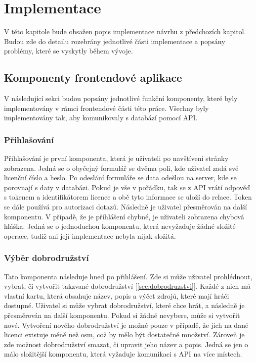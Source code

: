 \chapter{Implementace}
V této kapitole bude obsažen popis implementace návrhu z předchozích kapitol. Budou zde do detailu rozebrány jednotlivé části implementace a popsány problémy, které se vyskytly během vývoje.

\section{Komponenty frontendové aplikace}
V následující sekci budou popsány jednotlivé funkční komponenty, které byly implementovány v rámci frontendové části této práce. Všechny byly implementovány tak, aby komunikovaly s databází pomocí API.

\subsection{Přihlašování}
Přihlašování je první komponenta, která je uživateli po navštívení stránky zobrazena. Jedná se o obyčejný formulář se dvěma poli, kde uživatel zadá své licenční číslo a heslo. Po odeslání formuláře se data odešlou na server, kde se porovnají s daty v databázi. Pokud je vše v pořádku, tak se z API vrátí odpověď s tokenem a identifikátorem licence a obě tyto informace se uloží do relace. Token se dále používá pro autorizaci dotazů. Následně je uživatel přesměrován na další komponentu. V případě, že je příhlášení chybné, je uživateli zobrazena chybová hláška. Jedná se o jednoduchou komponentu, která nevyžaduje žádné složité operace, tudíž ani její implementace nebyla nijak složitá.

\subsection{Výběr dobrodružství}
Tato komponenta následuje hned po přihlášení. Zde si může uživatel prohlédnout, vybrat, či vytvořit takzvané dobrodružství [\ref{sec:dobrodruzstvi}]. Každé z nich má vlastní kartu, která obsahuje název, popis a výčet zdrojů, které mají hráči dostupné. Uživatel si může vybrat dobrodružství, které chce hrát, a následně je přesměrován na další komponentu. Pokud si žádné nevybere, může si vytvořit nové. Vytvoření nového dobrodružství je možné pouze v případě, že jich na dané licenci existuje méně než osm, což by mělo být dostatečné množství. Zároveň je zde možnost dobrodružství smazat, či upravit jeho název a popis. Jedná se jen o málo složitější komponentu, která vyžaduje komunikaci s API na více místech.

